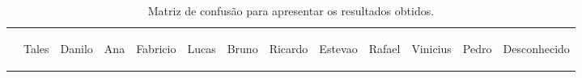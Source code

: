 	\begin{table}[htb]
		\begin{center}
			\caption{Matriz de confusão para apresentar os resultados obtidos.}
			\label{tab:matriz-confusao}
			\begin{tabular}{|c|c|c|c|c|c|c|c|c|c|c|c|c|}

				\hline  & \bf \begin{sideways}Tales\end{sideways} & \bf \begin{sideways}Danilo\end{sideways} & \bf \begin{sideways}Ana\end{sideways} & \bf \begin{sideways}Fabricio\end{sideways} & \bf \begin{sideways}Lucas\end{sideways} & \bf \begin{sideways}Bruno\end{sideways} & \bf \begin{sideways}Ricardo\end{sideways} & \bf \begin{sideways}Estevao\end{sideways} & \bf \begin{sideways}Rafael\end{sideways} &
				\bf \begin{sideways}Vinicius\end{sideways} & \bf \begin{sideways}Pedro\end{sideways} & \bf \begin{sideways}Desconhecido\end{sideways}\\ 
				

\end{tabular}
\end{center}
\end{table}
